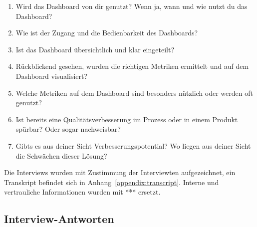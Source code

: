 \begin{enumerate}
    \item Wird das Dashboard von dir genutzt? Wenn ja, wann und wie nutzt du das Dashboard?
    \item Wie ist der Zugang und die Bedienbarkeit des Dashboards?
    \item Ist das Dashboard übersichtlich und klar eingeteilt?
    \item Rückblickend gesehen, wurden die richtigen Metriken ermittelt und auf dem Dashboard visualisiert?
    \item Welche Metriken auf dem Dashboard sind besonders nützlich oder werden oft genutzt?
    \item Ist bereits eine Qualitätsverbesserung im Prozess oder in einem Produkt spürbar? Oder sogar nachweisbar?
    \item Gibts es aus deiner Sicht Verbesserungspotential? Wo liegen aus deiner Sicht die Schwächen dieser Lösung?
\end{enumerate}

Die Interviews wurden mit Zustimmung der Interviewten aufgezeichnet, ein Transkript befindet sich in Anhang~\ref{appendix:transcript}.
Interne und vertrauliche Informationen wurden mit *** ersetzt.

\clearpage
\subsection{Interview-Antworten}


